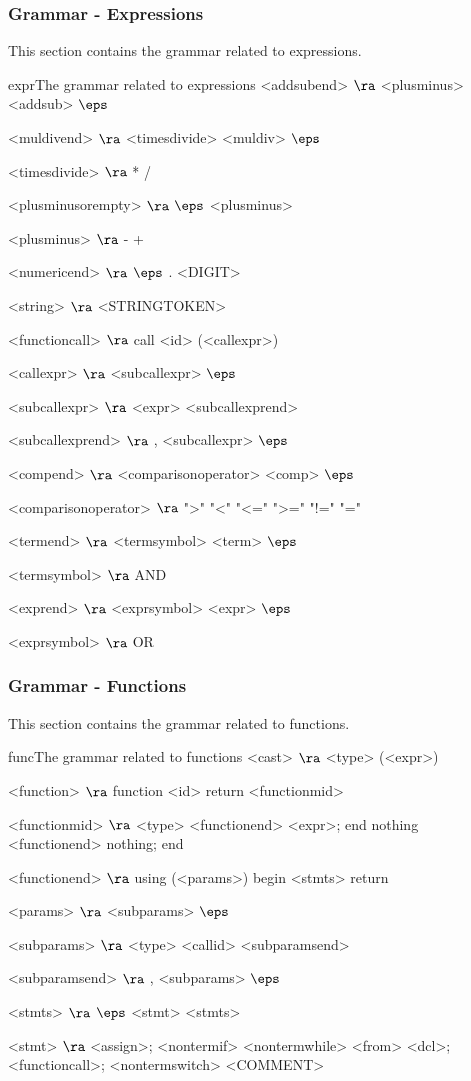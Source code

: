 \subsubsection{Grammar - Expressions}
This section contains the grammar related to expressions.
\begin{grammatik}{expr}{The grammar related to expressions}
<addsubend> $\ra$ <plusminus> <addsub>
\alt $\eps$

<muldivend> $\ra$ <timesdivide> <muldiv>
\alt $\eps$

<timesdivide> $\ra$ *
\alt /

<plusminusorempty> $\ra$ $\eps$
\alt <plusminus>

<plusminus> $\ra$ - 
\alt +

<numericend> $\ra$ $\eps$
\alt . <DIGIT>

<string> $\ra$ <STRINGTOKEN>

<functioncall> $\ra$ call <id> (<callexpr>)

<callexpr> $\ra$ <subcallexpr>
\alt$\eps$

<subcallexpr> $\ra$ <expr> <subcallexprend>

<subcallexprend> $\ra$ , <subcallexpr>
\alt$\eps$

<compend> $\ra$ <comparisonoperator> <comp>
\alt$\eps$

<comparisonoperator> $\ra$ ">"
				\alt "<"
				\alt "<="
				\alt ">="
				\alt "!="
				\alt "="

<termend> $\ra$ <termsymbol> <term>
\alt$\eps$

<termsymbol> $\ra$ AND 

<exprend> $\ra$ <exprsymbol> <expr>
\alt$\eps$

<exprsymbol> $\ra$ OR 
\end{grammatik}

\subsubsection{Grammar - Functions}
This section contains the grammar related to functions.
\begin{grammatik}{func}{The grammar related to functions}
<cast> $\ra$ <type> (<expr>)

<function> $\ra$ function <id> return <functionmid>

<functionmid> $\ra$ <type> <functionend> <expr>; end
\alt nothing <functionend> nothing; end

<functionend> $\ra$
using (<params>)
begin
	<stmts>
	return

<params> $\ra$ <subparams>
	\alt$\eps$

<subparams> $\ra$ <type> <callid> <subparamsend>

<subparamsend> $\ra$ , <subparams>
\alt$\eps$

<stmts> $\ra$ $\eps$
	\alt <stmt> <stmts>

<stmt> $\ra$ <assign>;
	\alt <nontermif>
	\alt <nontermwhile>
	\alt <from>
	\alt <dcl>;
	\alt <functioncall>;
	\alt <nontermswitch>
	\alt <COMMENT>
\end{grammatik}

